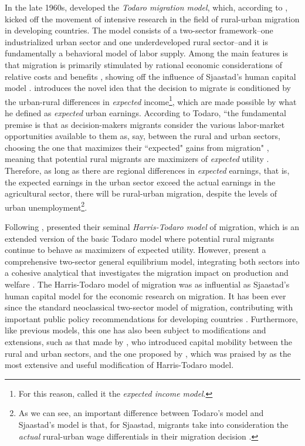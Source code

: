 In the late 1960s, \cite{todaro_model_1969} developed the \textit{Todaro migration model}, which, according to \cite{stark_migration_1991}, kicked off the movement of intensive research in the field of rural-urban migration in developing countries. The model consists of a two-sector framework--one industrialized urban sector and one underdeveloped rural sector--and it is fundamentally a behavioral model of labor supply. Among the main features is that migration is primarily stimulated by rational economic considerations of relative costs and benefits \citep{easterlin_internal_1980}, showing off the influence of Sjaastad's human capital model \citep{shields_emergence_1989, lucas_internal_1997}. \cite{todaro_model_1969} introduces the novel idea that the decision to migrate is conditioned by the urban-rural differences in \textit{expected} income\footnote{For this reason, \cite{shields_emergence_1989} called it the \textit{expected income model}.}, which are made possible by what he defined as \textit{expected} urban earnings. According to Todaro, ``the fundamental premise is that as decision-makers migrants consider the various labor-market opportunities available to them as, say, between the rural and urban sectors, choosing the one that maximizes their ``expected" gains from migration" \citep[p. 364]{easterlin_internal_1980}, meaning that potential rural migrants are maximizers of \textit{expected} utility \citep{easterlin_internal_1980}. Therefore, as long as there are regional differences in \textit{expected} earnings, that is, the expected earnings in the urban sector exceed the actual earnings in the agricultural sector, there will be rural-urban migration, despite the levels of urban unemployment\footnote{As we can see, an important difference between Todaro's model and Sjaastad's model is that, for Sjaastad, migrants take into consideration the \textit{actual} rural-urban wage differentials in their migration decision \citep{lucas_internal_1997}.}.

Following \cite{todaro_model_1969}, \cite{harris_migration_1970} presented their seminal \textit{Harris-Todaro model} of migration, which is an extended version of the basic Todaro model where potential rural migrants continue to behave as maximizers of expected utility. However, \cite{harris_migration_1970} present a comprehensive two-sector general equilibrium model, integrating both sectors into a cohesive analytical that investigates the migration impact on production and welfare \citep{harris_migration_1970, easterlin_internal_1980}. The Harris-Todaro model of migration was as influential as Sjaastad's human capital model for the economic research on migration. It has been ever since the standard neoclassical two-sector model of migration, contributing with important public policy recommendations for developing countries \citep{harris_migration_1970, easterlin_internal_1980}. Furthermore, like previous models, this one has also been subject to modifications and extensions, such as that made by \cite{corden_urban_1975}, who introduced capital mobility between the rural and urban sectors, and the one proposed by \cite{fields_rural-urban_1975}, which was praised by \cite{easterlin_internal_1980} as the most extensive and useful modification of Harris-Todaro model.

